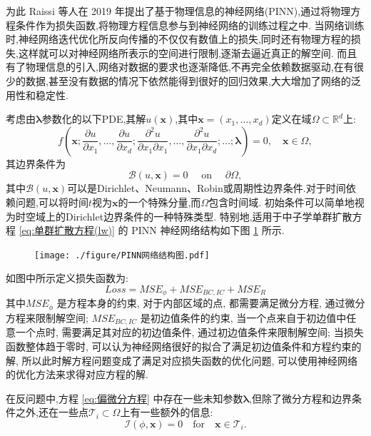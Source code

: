 \documentclass{Sichuan Normal University}
\begin{document}
为此 Raissi 等人在 2019 年提出了基于物理信息的神经网络(PINN)\cite{raissiPhysicsinformedNeuralNetworks2019},通过将物理方程条件作为损失函数,将物理方程信息参与到神经网络的训练过程之中.
当网络训练时,神经网络迭代优化所反向传播的不仅仅有数值上的损失,同时还有物理方程的损失,这样就可以对神经网络所表示的空间进行限制,逐渐去逼近真正的解空间.
而且有了物理信息的引入,网络对数据的要求也逐渐降低,不再完全依赖数据驱动,在有很少的数据,甚至没有数据的情况下依然能得到很好的回归效果,大大增加了网络的泛用性和稳定性.

考虑由$\boldsymbol{\lambda}$参数化的以下PDE,其解$u(\mathbf{x})$,其中$\mathbf{x}=\left(x_1, \ldots, x_d\right)$定义在域$\Omega \subset \mathbb{R}^d$上:
\begin{equation}
f\left(\mathbf{x} ; \frac{\partial u}{\partial x_1}, \ldots, \frac{\partial u}{\partial x_d} ; \frac{\partial^2 u}{\partial x_1 \partial x_1}, \ldots, \frac{\partial^2 u}{\partial x_1 \partial x_d} ; \ldots ; \boldsymbol{\lambda}\right)=0, \quad \mathbf{x} \in \Omega,
\label{eq:偏微分方程}
\end{equation}
其边界条件为
\begin{equation}
\mathcal{B}(u, \mathbf{x})=0 \quad \text { on } \quad \partial \Omega,
\end{equation}
其中$\mathcal{B}(u, \mathbf{x})$可以是Dirichlet、Neumann、Robin或周期性边界条件.对于时间依赖问题,可以将时间$t$视为$\mathbf{x}$的一个特殊分量,而$\Omega$包含时间域.
初始条件可以简单地视为时空域上的Dirichlet边界条件的一种特殊类型.
特别地,适用于中子学单群扩散方程 \eqref{eq:单群扩散方程(lw)} 的 PINN 神经网络结构如下图 \ref{fig:PINN Network Structure} 所示.
\begin{figure}[H]
    \centering
    \texttt{[image: ./figure/PINN网络结构图.pdf]}
    \label{fig:PINN Network Structure}
    \end{figure}
如图中所示定义损失函数为:
\begin{equation}
    Loss =M S E_\phi+M S E_{B C, I C}+M S E_R
    \label{eq:损失函数}  
\end{equation}其中$M S E_\phi$ 是方程本身的约束, 对于内部区域的点, 都需要满足微分方程, 通过微分方程来限制解空间;
$M S E_{B C, I C}$ 是初边值条件的约束, 当一个点来自于初边值中任意一个点时, 需要满足其对应的初边值条件, 通过初边值条件来限制解空间; 
当损失函数整体趋于零时, 可以认为神经网络很好的拟合了满足初边值条件和方程约束的解, 所以此时解方程问题变成了满足对应损失函数的优化问题, 可以使用神经网络的优化方法来求得对应方程的解.

在反问题中,方程 \eqref{eq:偏微分方程} 中存在一些未知参数$\boldsymbol{\lambda}$,但除了微分方程和边界条件之外,还在一些点$\mathcal{T}_i \subset \Omega$上有一些额外的信息:
\begin{equation}
\mathcal{I}(\phi, \mathbf{x})=0 \quad \text{for} \quad \mathbf{x} \in \mathcal{T}_i .
\end{equation}
\end{document}
